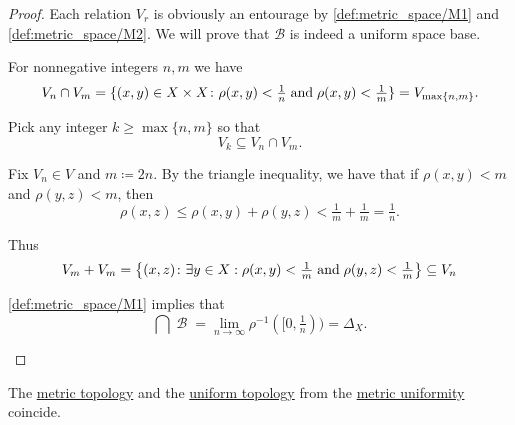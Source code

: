 \begin{proof}
  Each relation \( V_r \) is obviously an entourage by \ref{def:metric_space/M1} and \ref{def:metric_space/M2}. We will prove that \( \mathcal{B} \) is indeed a uniform space base.

  \begin{refenum}
     For nonnegative integers \( n, m \) we have
    \begin{equation*}
      V_n \cap V_m
      =
      \{ (x, y) \in X \times X \colon \rho(x, y) < \tfrac 1 n \T{and} \rho(x, y) < \tfrac 1 m \}
      =
      V_{\max\{ n, m \}}.
    \end{equation*}

    Pick any integer \( k \geq \max\{ n, m \} \) so that
    \begin{equation*}
      V_k \subseteq V_n \cap V_m.
    \end{equation*}

     Fix \( V_n \in V \) and \( m \coloneqq 2n \). By the triangle inequality, we have that if \( \rho(x, y) < m \) and \( \rho(y, z) < m \), then
    \begin{equation*}
      \rho(x, z) \leq \rho(x, y) + \rho(y, z) < \tfrac 1 m + \tfrac 1 m = \tfrac 1 n.
    \end{equation*}

    Thus
    \begin{equation*}
      V_m + V_m
      =
      \left\{ (x, z) \colon \exists y \in X: \rho(x, y) < \tfrac 1 m \T{and} \rho(y, z) < \tfrac 1 m \right\}
      \subseteq
      V_n
    \end{equation*}

     \ref{def:metric_space/M1} implies that
    \begin{equation*}
      \bigcap \mscrB = \lim_{n \to \infty} \rho^{-1}([0, \tfrac 1 n)) = \Delta_X.
    \end{equation*}
  \end{refenum}
\end{proof}

\begin{proposition}\label{thm:metric_topology_coincides_with_uniform_topology}
  The \hyperref[def:metric_topology]{metric topology} and the \hyperref[def:uniform_topology]{uniform topology} from the \hyperref[def:metric_uniformity]{metric uniformity} coincide.
\end{proposition}

